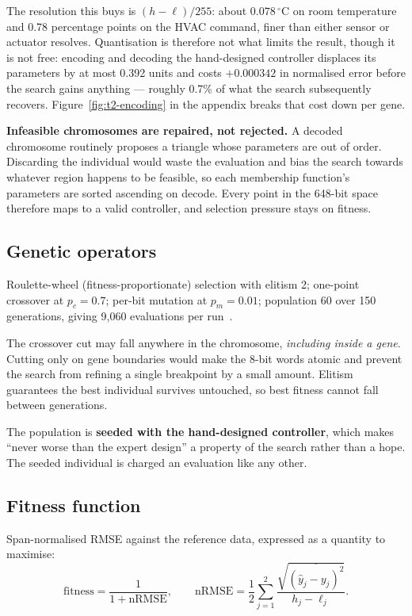 The resolution this buys is $(h-\ell)/255$: about $0.078\,^{\circ}$C on room
temperature and 0.78 percentage points on the HVAC command, finer than either
sensor or actuator resolves. Quantisation is therefore not what limits the
result, though it is not free: encoding and decoding the hand-designed
controller displaces its parameters by at most 0.392 units and costs
$+0.000342$ in normalised error before the search gains anything --- roughly
0.7\% of what the search subsequently recovers.
Figure~\ref{fig:t2-encoding} in the appendix breaks that cost down per gene.

\textbf{Infeasible chromosomes are repaired, not rejected.} A decoded chromosome
routinely proposes a triangle whose parameters are out of order. Discarding the
individual would waste the evaluation and bias the search towards whatever
region happens to be feasible, so each membership function's parameters are
sorted ascending on decode. Every point in the 648-bit space therefore maps to a
valid controller, and selection pressure stays on fitness.

\subsection{Genetic operators}

Roulette-wheel (fitness-proportionate) selection with elitism 2; one-point
crossover at $p_c = 0.7$; per-bit mutation at $p_m = 0.01$; population 60 over
150 generations, giving 9{,}060 evaluations per run~\cite{goldberg1989}.

The crossover cut may fall anywhere in the chromosome, \emph{including inside a
gene}. Cutting only on gene boundaries would make the 8-bit words atomic and
prevent the search from refining a single breakpoint by a small amount. Elitism
guarantees the best individual survives untouched, so best fitness cannot fall
between generations.

The population is \textbf{seeded with the hand-designed controller}, which makes
``never worse than the expert design'' a property of the search rather than a
hope. The seeded individual is charged an evaluation like any other.

\subsection{Fitness function}

Span-normalised RMSE against the reference data, expressed as a quantity to
maximise:
\begin{equation}
\mathrm{fitness} = \frac{1}{1 + \mathrm{nRMSE}},
\qquad
\mathrm{nRMSE} = \frac{1}{2}\sum_{j=1}^{2}
\frac{\sqrt{\overline{(\hat{y}_j - y_j)^2}}}{h_j - \ell_j}.
\end{equation}

